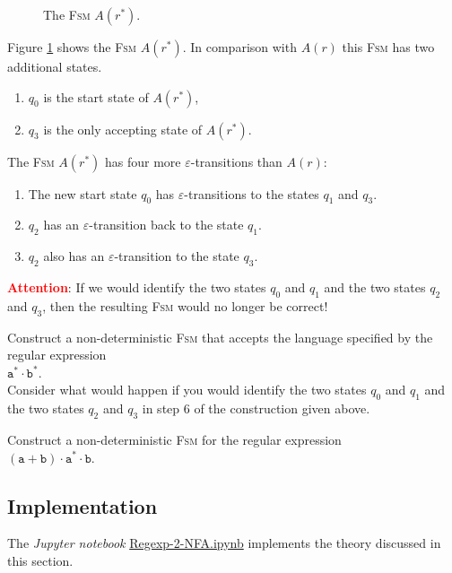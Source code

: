 \begin{enumerate}
      \begin{figure}[!ht]
        \centering
      \caption{The \textsc{Fsm} $A(r^*)$.}
      \label{fig:aStar.eps}
      \end{figure}
      Figure \ref{fig:aStar.eps} shows the \textsc{Fsm} $A(r^*)$.
      In comparison with $A(r)$ this \textsc{Fsm} has two additional states.
      \begin{enumerate}
      \item $q_0$ is the start state of $A(r^*)$,
      \item $q_3$ is the only accepting state of $A(r^*)$.
      \end{enumerate}
      The \textsc{Fsm} $A(r^*)$ has four more $\varepsilon$-transitions than $A(r)$: 
      \begin{enumerate}
      \item The new start state  $q_0$ has $\varepsilon$-transitions to the states
            $q_1$ and $q_3$.
      \item $q_2$ has an $\varepsilon$-transition back to the state $q_1$.
      \item $q_2$ also has an $\varepsilon$-transition to the state $q_3$.
      \end{enumerate}
      \textbf{\textcolor{red}{Attention}}:  If we would identify the two states 
      $q_0$ and $q_1$ and the two states $q_2$ and $q_3$, then the resulting \textsc{Fsm} would no longer be
      correct!
\end{enumerate}

\exerciseEng
Construct a non-deterministic \textsc{Fsm} that accepts the language specified by the regular expression
\\[0.2cm]
\hspace*{1.3cm}
$\texttt{a}^* \cdot \texttt{b}^*$.
\\[0.2cm]
Consider what would happen if you would identify the two states 
$q_0$ and $q_1$ and the two states $q_2$ and $q_3$ in step 6 of the construction given above. 
\eox

\exerciseEng
Construct a non-deterministic \textsc{Fsm} for the regular expression
\\[0.2cm]
\hspace*{1.3cm}
$(\texttt{a} + \texttt{b}) \cdot \texttt{a}^* \cdot \texttt{b}$.  
\eox

\subsection{Implementation}
The \textsl{Jupyter notebook}
\href{https://github.com/karlstroetmann/Formal-Languages/blob/master/Python/Regexp-2-NFA.ipynb}{Regexp-2-NFA.ipynb} 
implements the theory discussed in this section.



